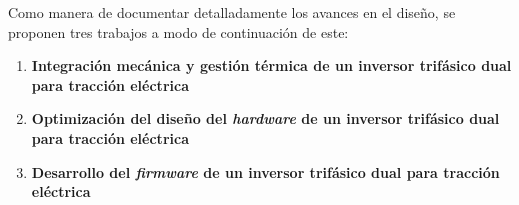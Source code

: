 Como manera de documentar detalladamente los avances en el diseño, se proponen tres trabajos a modo de continuación de este:

\begin{enumerate}
	
	\item \textbf{Integración mecánica y gestión térmica de un inversor trifásico dual para tracción eléctrica}
	\item \textbf{Optimización del diseño del \textit{hardware} de un inversor trifásico dual para tracción eléctrica}
	\item \textbf{Desarrollo del \textit{firmware} de un inversor trifásico dual para tracción eléctrica}

\end{enumerate}